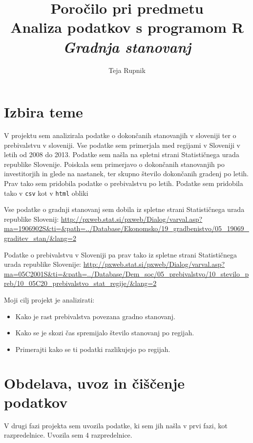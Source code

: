 \documentclass[11pt,a4paper]{article}
\begin{document}
\title{Poročilo pri predmetu \\
Analiza podatkov s programom R\\
\vspace{15mm}
\textbf{\emph{Gradnja stanovanj}}}
\author{Teja Rupnik}
\maketitle

\newpage
\section{Izbira teme}
V projektu sem analizirala podatke o dokončanih stanovanjih v sloveniji ter o prebivalstvu v sloveniji. Vse podatke sem primerjala med regijami v Sloveniji v letih od 2008 do 2013. Podatke sem našla na spletni strani Statističnega urada republike Slovenije. Poiskala sem primerjavo o dokončanih stanovanjih po investitorjih in glede na nastanek, ter skupno število dokončanih gradenj po letih. Prav tako sem pridobila podatke o prebivalstvu po letih. Podatke sem pridobila tako v \verb|csv| kot v  \verb|html| obliki

Vse podatke o gradnji stanovanj sem dobila iz spletne strani Statističnega urada republike Slovenij:
\url{http://pxweb.stat.si/pxweb/Dialog/varval.asp?ma=1906902S&ti=&path=../Database/Ekonomsko/19_gradbenistvo/05_19069_graditev_stan/&lang=2}

Podatke o prebivalstvu v Sloveniji pa prav tako iz spletne strani Statističnega urada republike Slovenije:
\url{http://pxweb.stat.si/pxweb/Dialog/varval.asp?ma=05C2001S&ti=&path=../Database/Dem_soc/05_prebivalstvo/10_stevilo_preb/10_05C20_prebivalstvo_stat_regije/&lang=2}

Moji cilj projekt je analizirati:
\begin{itemize}
\item{Kako je rast prebivalstva povezana gradno stanovanj.} 
\item{Kako se je skozi čas spremijalo število stanovanj po regijah.} 
\item{Primerajti kako se ti podatki razlikujejo po regijah.}
\end{itemize}

\newpage
\section{Obdelava, uvoz in čiščenje podatkov}
V drugi fazi projekta sem uvozila podatke, ki sem jih našla v prvi fazi, kot razpredelnice. Uvozila sem 4 razpredelnice.
\end{document}
